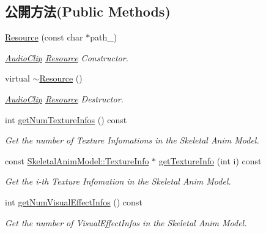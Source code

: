 \subsection*{公開方法(Public Methods)}
\begin{DoxyCompactItemize}
\item 
\hyperlink{class_magnum_1_1_skeletal_anim_model_1_1_resource_a169c1978518651fe27452c14ff9e5376}{Resource} (const char $\ast$path\+\_\+)
\begin{DoxyCompactList}\small\item\em \hyperlink{class_magnum_1_1_audio_clip}{Audio\+Clip} \hyperlink{class_magnum_1_1_skeletal_anim_model_1_1_resource}{Resource} Constructor. \end{DoxyCompactList}\item 
virtual \hyperlink{class_magnum_1_1_skeletal_anim_model_1_1_resource_a5fd6b800077cdd255d43bb86c1095513}{$\sim$\+Resource} ()
\begin{DoxyCompactList}\small\item\em \hyperlink{class_magnum_1_1_audio_clip}{Audio\+Clip} \hyperlink{class_magnum_1_1_skeletal_anim_model_1_1_resource}{Resource} Destructor. \end{DoxyCompactList}\item 
int \hyperlink{class_magnum_1_1_skeletal_anim_model_1_1_resource_abe338e5eda7a29af91739b404dc02da8}{get\+Num\+Texture\+Infos} () const 
\begin{DoxyCompactList}\small\item\em Get the number of Texture Infomations in the Skeletal Anim Model. \end{DoxyCompactList}\item 
const \hyperlink{class_magnum_1_1_skeletal_anim_model_1_1_texture_info}{Skeletal\+Anim\+Model\+::\+Texture\+Info} $\ast$ \hyperlink{class_magnum_1_1_skeletal_anim_model_1_1_resource_a7b2f4748aaa9774f04aa21b3a46d4943}{get\+Texture\+Info} (int i) const 
\begin{DoxyCompactList}\small\item\em Get the i-\/th Texture Infomation in the Skeletal Anim Model. \end{DoxyCompactList}\item 
int \hyperlink{class_magnum_1_1_skeletal_anim_model_1_1_resource_a8d76b34f2fc4c590f7d6b600473d3e2d}{get\+Num\+Visual\+Effect\+Infos} () const 
\begin{DoxyCompactList}\small\item\em Get the number of Visual\+Effect\+Infos in the Skeletal Anim Model. \end{DoxyCompactList}\item 

\end{DoxyCompactItemize}
